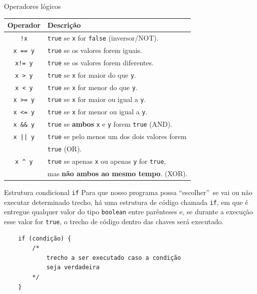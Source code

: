 \documentclass{beamer}
\begin{document}
\begin{frame}{Operadores lógicos}
    \begin{center}
        \begin{tabular}{cl}
            \toprule
            Operador & Descrição \\
            \midrule
            \texttt{!x} & \texttt{true} se \texttt{x} for \texttt{false} (inversor/NOT). \\
            \texttt{x == y} & \texttt{true} se os valores forem iguais. \\
            \texttt{x\hspace{1ex}!= y} & \texttt{true} se os valores forem diferentes. \\
            \texttt{x > y} & \texttt{true} se \texttt{x} for maior do que \texttt{y}. \\
            \texttt{x < y} & \texttt{true} se \texttt{x} for menor do que \texttt{y}. \\
            \texttt{x >= y} & \texttt{true} se \texttt{x} for maior ou igual a \texttt{y}. \\
            \texttt{x <= y} & \texttt{true} se \texttt{x} for menor ou igual a \texttt{y}. \\
            \texttt{x \&\& y} & \texttt{true} se \textbf{ambos} \texttt{x} e \texttt{y} forem \texttt{true} (AND). \\
            \texttt{x || y} & \texttt{true} se pelo menos um dos dois valores forem \\
            & \texttt{true} (OR). \\
            \texttt{x \^{} y} & \texttt{true} se apenas \texttt{x} ou apenas \texttt{y} for \texttt{true}, \\
            & mas \textbf{não ambos ao mesmo tempo}. (XOR). \\
            \bottomrule
        \end{tabular}
    \end{center}
\end{frame}

\begin{frame}[fragile]{Estrutura condicional \texttt{if}}
    Para que nosso programa possa ``escolher''\ se vai ou não executar determinado
    trecho, há uma estrutura de código chamada \texttt{if}, em que é entregue
    qualquer valor do tipo \texttt{boolean} entre parênteses e, se durante a
    execução esse valor for \texttt{true}, o trecho de código dentro das chaves
    será executado.

    \begin{verbatim}
    if (condição) {
        /*
            trecho a ser executado caso a condição
            seja verdadeira
        */
    }
    \end{verbatim}
\end{frame}
\end{document}
